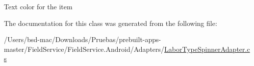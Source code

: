 Text color for the item 



The documentation for this class was generated from the following file\+:\begin{DoxyCompactItemize}
\item 
/\+Users/bsd-\/mac/\+Downloads/\+Pruebas/prebuilt-\/apps-\/master/\+Field\+Service/\+Field\+Service.\+Android/\+Adapters/\hyperlink{_labor_type_spinner_adapter_8cs}{Labor\+Type\+Spinner\+Adapter.\+cs}\end{DoxyCompactItemize}
